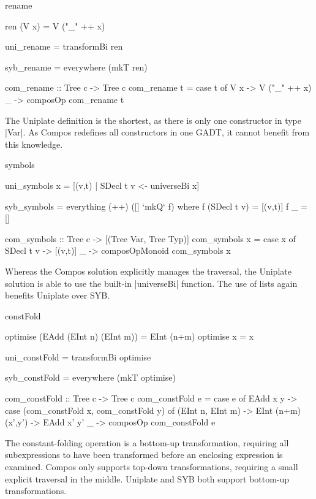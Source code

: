 \begin{examplename}{rename}

\ignore\begin{code}
ren (V x) = V ("_" ++ x)

uni_rename = transformBi ren

syb_rename = everywhere (mkT ren)

com_rename :: Tree c -> Tree c
com_rename t = case t of
    V x -> V ("_" ++ x)
    _   -> composOp com_rename t
\end{code}

The Uniplate definition is the shortest, as there is only one constructor in type |Var|. As Compos redefines all constructors in one GADT, it cannot benefit from this knowledge.
\end{examplename}

\begin{examplename}{symbols}

\ignore\begin{code}
uni_symbols x = [(v,t) | SDecl t v <- universeBi x]
\end{code}
\ignore\begin{code}
syb_symbols = everything (++) ([] `mkQ` f)
    where  f (SDecl t v)  = [(v,t)]
           f _            = []
\end{code}
\begin{onepage}
\ignore\begin{code}
com_symbols :: Tree c -> [(Tree Var, Tree Typ)]
com_symbols x = case x of
    SDecl t v -> [(v,t)]
    _ -> composOpMonoid com_symbols x
\end{code}
\end{onepage}

Whereas the Compos solution explicitly manages the traversal, the Uniplate solution is able to use the built-in |universeBi| function. The use of lists again benefits Uniplate over SYB.
\end{examplename}

\begin{examplename}{constFold}

\ignore\begin{code}
optimise (EAdd (EInt n) (EInt m)) = EInt (n+m)
optimise x = x

uni_constFold = transformBi optimise

syb_constFold = everywhere (mkT optimise)

com_constFold :: Tree c -> Tree c
com_constFold e = case e of
    EAdd x y -> case  (com_constFold x, com_constFold y) of
                      (EInt n, EInt m) -> EInt (n+m)
                      (x',y') -> EAdd x' y'
    _ -> composOp com_constFold e
\end{code}

The constant-folding operation is a bottom-up transformation, requiring all subexpressions to have been transformed before an enclosing expression is examined. Compos only supports top-down transformations, requiring a small explicit traversal in the middle. Uniplate and SYB both support bottom-up transformations.
\end{examplename}

